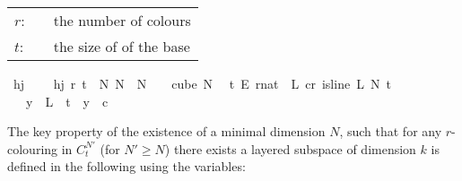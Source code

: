 \begin{isabellebody}
\begin{isamarkuptext}
\begin{tabular}{llp{8cm}}
$r$:& \isa{nat}& the number of colours\\
$t$:& \isa{nat}& the size of of the base
\end{tabular}%
\end{isamarkuptext}\isamarkuptrue%
\isamarkupfalse%
\ hj\ \isanewline
\ \ \ {\isachardoublequoteopen}hj\ r\ t\ {\isasymequiv}\ {\isacharparenleft}{\kern0pt}{\isasymexists}N{\isachargreater}{\kern0pt}{}{\isachardot}{\kern0pt}\ {\isasymforall}N{\isacharprime}{\kern0pt}\ {\isasymge}\ N{\isachardot}{\kern0pt}\ {\isasymforall}{\isasymchi}{\isachardot}{\kern0pt}\ {\isasymchi}\ {\isasymin}\ {\isacharparenleft}{\kern0pt}cube\ N{\isacharprime}{\kern0pt}\isanewline
\ \ t{\isacharparenright}{\kern0pt}\ {\isasymrightarrow}\isactrlsub E\ {\isacharbraceleft}{\kern0pt}{\isachardot}{\kern0pt}{\isachardot}{\kern0pt}{\isacharless}{\kern0pt}r{\isacharcolon}{\kern0pt}{\isacharcolon}{\kern0pt}nat{\isacharbraceright}{\kern0pt}\ {\isasymlongrightarrow}\ {\isacharparenleft}{\kern0pt}{\isasymexists}L{\isachardot}{\kern0pt}\ {\isasymexists}c{\isacharless}{\kern0pt}r{\isachardot}{\kern0pt}\ is{\isacharunderscore}{\kern0pt}line\ L\ N{\isacharprime}{\kern0pt}\ t\isanewline
\ \ {\isasymand}\ {\isacharparenleft}{\kern0pt}{\isasymforall}y\ {\isasymin}\ L\ {\isacharbackquote}{\kern0pt}\ {\isacharbraceleft}{\kern0pt}{\isachardot}{\kern0pt}{\isachardot}{\kern0pt}{\isacharless}{\kern0pt}t{\isacharbraceright}{\kern0pt}{\isachardot}{\kern0pt}\ {\isasymchi}\ y\ {\isacharequal}{\kern0pt}\ c{\isacharparenright}{\kern0pt}{\isacharparenright}{\kern0pt}{\isacharparenright}{\kern0pt}{\isachardoublequoteclose}%
\begin{isamarkuptext}%
The key property of the existence of a minimal dimension $N$, such that for any
$r$-colouring in $C^{N'}_t$ (for $N' \geq N$) there exists a layered subspace of dimension $k$ is
defined in the following using the variables:


\end{isamarkuptext}
\end{isabellebody}
